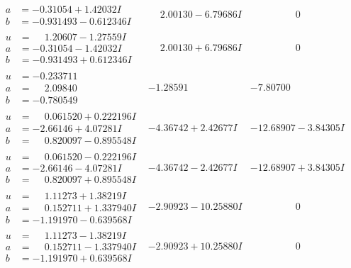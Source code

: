 \documentclass[1p]{elsarticle_modified}
\theoremstyle{definition}
\begin{document}
$$\begin{array}{c|c|c}
\begin{aligned}
a &= -0.31054 + 1.42032 I \\
b &= -0.931493 - 0.612346 I\end{aligned}
 & \phantom{-}2.00130 - 6.79686 I & \phantom{-0.000000 } 0 \\ \hline\begin{aligned}
u &= \phantom{-}1.20607 - 1.27559 I \\
a &= -0.31054 - 1.42032 I \\
b &= -0.931493 + 0.612346 I\end{aligned}
 & \phantom{-}2.00130 + 6.79686 I & \phantom{-0.000000 } 0 \\ \hline\begin{aligned}
u &= -0.233711\phantom{ +0.000000I} \\
a &= \phantom{-}2.09840\phantom{ +0.000000I} \\
b &= -0.780549\phantom{ +0.000000I}\end{aligned}
 & -1.28591\phantom{ +0.000000I} & -7.80700\phantom{ +0.000000I} \\ \hline\begin{aligned}
u &= \phantom{-}0.061520 + 0.222196 I \\
a &= -2.66146 + 4.07281 I \\
b &= \phantom{-}0.820097 - 0.895548 I\end{aligned}
 & -4.36742 + 2.42677 I & -12.68907 - 3.84305 I \\ \hline\begin{aligned}
u &= \phantom{-}0.061520 - 0.222196 I \\
a &= -2.66146 - 4.07281 I \\
b &= \phantom{-}0.820097 + 0.895548 I\end{aligned}
 & -4.36742 - 2.42677 I & -12.68907 + 3.84305 I \\ \hline\begin{aligned}
u &= \phantom{-}1.11273 + 1.38219 I \\
a &= \phantom{-}0.152711 + 1.337940 I \\
b &= -1.191970 - 0.639568 I\end{aligned}
 & -2.90923 - 10.25880 I & \phantom{-0.000000 } 0 \\ \hline\begin{aligned}
u &= \phantom{-}1.11273 - 1.38219 I \\
a &= \phantom{-}0.152711 - 1.337940 I \\
b &= -1.191970 + 0.639568 I\end{aligned}
 & -2.90923 + 10.25880 I & \phantom{-0.000000 } 0 \\ \hline\begin{aligned}

\end{aligned}
\end{array}$$
\end{document}
